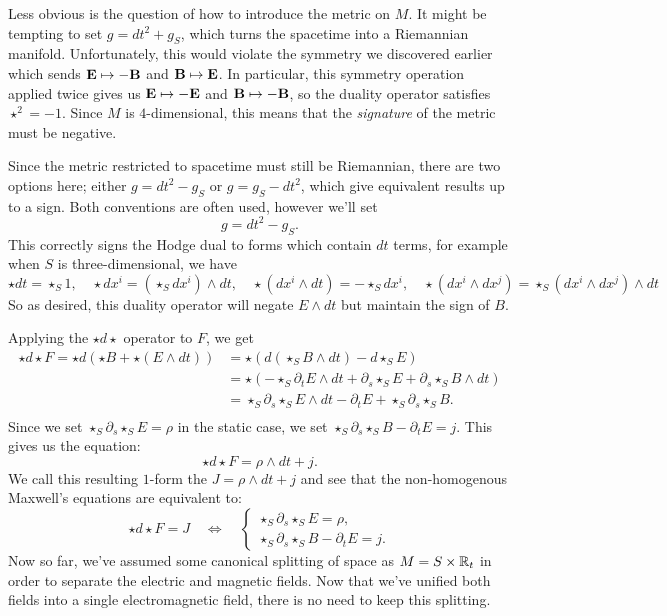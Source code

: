 \documentclass{article}
\begin{document}
Less obvious is the question of how to introduce the metric on $M$. It might be tempting to set $g = dt^2 + g_S$, which turns the spacetime into a Riemannian manifold.
Unfortunately, this would violate the symmetry we discovered earlier which sends $\mathbf{E} \mapsto -\mathbf{B}$ and $\mathbf{B} \mapsto \mathbf{E}$. In particular, this symmetry operation applied twice gives us $\mathbf{E} \mapsto -\mathbf{E}$ and $\mathbf{B} \mapsto -\mathbf{B}$, so the duality operator satisfies $\star^2=-1$. Since $M$ is $4$-dimensional, this means that the \emph{signature} of the metric must be negative.

Since the metric restricted to spacetime must still be Riemannian, there are two options here; either $g=dt^2-g_S$ or $g=g_S-dt^2$, which give equivalent results up to a sign. Both conventions are often used, however we'll set \[g = dt^2 - g_S.\] This correctly signs the Hodge dual to forms which contain $dt$ terms, for example when $S$ is three-dimensional, we have
\[
  \star dt = \star_S 1, \quad \star dx^i = (\star_S dx^i)\wedge dt, \quad \star (dx^i\wedge dt) = -\star_S dx^i, \quad \star (dx^i\wedge dx^j) = \star_S (dx^i\wedge dx^j) \wedge dt
\]
So as desired, this duality operator will negate $E\wedge dt$ but maintain the sign of $B$.

Applying the $\star d\star$ operator to $F$, we get
\[
  \begin{aligned}
    \star d\!\star\! F = \star d(\star B + \star(E\wedge dt))
    &= \star \left(d(\star_S B \wedge dt) - d\star_S E\right)\\
    &= \star \left( -\star_S\! \partial_t E \wedge dt + \partial_s\! \star_S\! E + \partial_s \star_S B \wedge dt\right)\\
    &=\star_S \partial_s\! \star_S \! E \wedge dt -\partial_t E + \star_S \partial_s\! \star_S\! B.\\
  \end{aligned}
\]
Since we set $\star_S \partial_s\! \star_S\! E = \rho$ in the static case, we set $\star_S\partial_s \star_S B - \partial_t E = j$. This gives us the equation:
\[ \star d\!\star\! F = \rho\wedge dt + j.\]
We call this resulting $1$-form the  $J= \rho\wedge dt + j$ and see that the non-homogenous Maxwell's equations are equivalent to:
\[
  \star d\!\star\! F = J \quad\iff\quad \begin{cases}\star_S \partial_s\! \star_S\! E = \rho,\\ \star_S\partial_s \star_S B - \partial_t E = j.\end{cases}
\]
Now so far, we've assumed some canonical splitting of space as $M = S\times \mathbb{R}_t$ in order to separate the electric and magnetic fields. Now that we've unified both fields into a single electromagnetic field, there is no need to keep this splitting.
\end{document}
